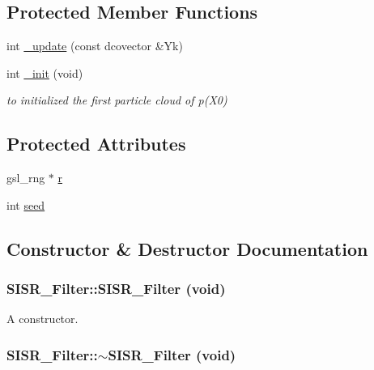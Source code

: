 \subsection*{Protected Member Functions}
\begin{CompactItemize}
\item 
int \hyperlink{class_s_i_s_r___filter_e6aac1c96b9c6803425fd712cbf730d1}{\_\-update} (const dcovector \&Yk)
\item 
int \hyperlink{class_s_i_s_r___filter_307c7a9012848bb6d441020443191725}{\_\-init} (void)
\begin{CompactList}\small\item\em to initialized the first particle cloud of p(X0) \item\end{CompactList}\end{CompactItemize}
\subsection*{Protected Attributes}
\begin{CompactItemize}
\item 
gsl\_\-rng $\ast$ \hyperlink{class_s_i_s_r___filter_3ff0a8a77b5651e779606cb52a07ae9d}{r}
\item 
int \hyperlink{class_s_i_s_r___filter_aefe1be49175842bd0bd115e0f2dd647}{seed}
\end{CompactItemize}


\subsection{Constructor \& Destructor Documentation}
\hypertarget{class_s_i_s_r___filter_ea2d9da796f3b59061d3c20b8d260794}{
\subsubsection[{SISR\_\-Filter}]{\setlength{\rightskip}{0pt plus 5cm}SISR\_\-Filter::SISR\_\-Filter (void)}}
\label{class_s_i_s_r___filter_ea2d9da796f3b59061d3c20b8d260794}


A constructor. 

\hypertarget{class_s_i_s_r___filter_9b76e88c5ce33eb3f3835084feaffb8c}{
\subsubsection[{$\sim$SISR\_\-Filter}]{\setlength{\rightskip}{0pt plus 5cm}SISR\_\-Filter::$\sim$SISR\_\-Filter (void)}}
\label{class_s_i_s_r___filter_9b76e88c5ce33eb3f3835084feaffb8c}


